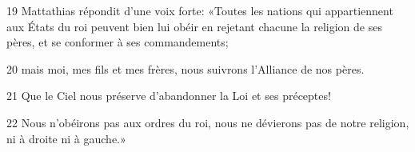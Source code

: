 
19 Mattathias répondit d’une voix forte: «Toutes les nations qui appartiennent aux États du roi peuvent bien lui obéir en rejetant chacune la religion de ses pères, et se conformer à ses commandements;

20 mais moi, mes fils et mes frères, nous suivrons l’Alliance de nos pères.

21 Que le Ciel nous préserve d’abandonner la Loi et ses préceptes!

22 Nous n’obéirons pas aux ordres du roi, nous ne dévierons pas de notre religion, ni à droite ni à gauche.»
